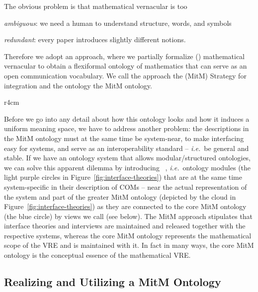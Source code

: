 The obvious problem is that mathematical vernacular is too 
\begin{inparaenum}[\em i\rm)]
\item \emph{ambiguous}: we need a human to understand structure, words, and symbols
\item \emph{redundant}: every paper introduces slightly different notions. 
\end{inparaenum}
Therefore we adopt an approach, where we partially formalize ()
mathematical vernacular to obtain a flexiformal ontology of mathematics that can serve as
an open communication vocabulary. We call the approach the 
(MitM) Strategy for integration and the ontology the MitM ontology. 
\begin{wrapfigure}r{4cm}\vspace*{-1.5em}
  \vspace*{-.5em}
  \caption{Interface theories}\label{fig:interface-theories}\vspace*{-1em}
\end{wrapfigure}
Before we go into any detail about how this ontology looks and how it induces a uniform
meaning space, we have to address another problem: the descriptions in the MitM ontology
must at the same time be system-near, to make interfacing easy for systems, and serve as
an interoperability standard -- \emph{i.e.}\ be general and stable. If we have an ontology system
that allows modular/structured ontologies, we can solve this apparent dilemma by
introducing ~\cite{KohRabSac:fvip11}, \emph{i.e.}\ ontology modules
(the light purple circles in Figure~\ref{fig:interface-theories}) that are at the same
time system-specific in their description of COMs -- near the actual representation of the
system and part of the greater MitM ontology (depicted by the cloud in
Figure~\ref{fig:interface-theories}) as they are connected to the core MitM ontology (the
blue circle) by views we call  (see below). The MitM approach
stipulates that interface theories and interviews are maintained and released together with
the respective systems, whereas the core MitM ontology represents the mathematical scope
of the VRE and is maintained with it. In fact in many ways, the core MitM ontology is the
conceptual essence of the mathematical VRE.

\subsection{Realizing and Utilizing a MitM Ontology}


